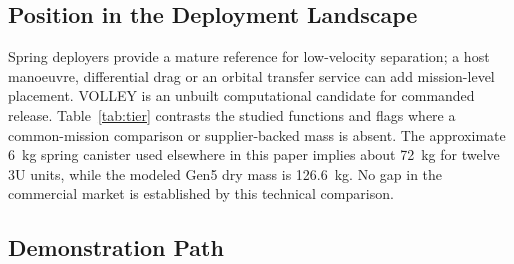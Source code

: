 \documentclass[conference]{IEEEtran}
\begin{document}
\subsection{Position in the Deployment Landscape}
Spring deployers provide a mature reference for low-velocity separation; a host manoeuvre, differential drag or an orbital transfer service can add mission-level placement. VOLLEY is an unbuilt computational candidate for commanded release. Table~\ref{tab:tier} contrasts the studied functions and flags where a common-mission comparison or supplier-backed mass is absent. The approximate 6~kg spring canister used elsewhere in this paper implies about 72~kg for twelve 3U units, while the modeled Gen5 dry mass is 126.6~kg. No gap in the commercial market is established by this technical comparison.

\begin{table}[t]
\caption{Service tiers for small-satellite orbit placement. VOLLEY's system mass is 126.6~kg dry and 174.6~kg loaded with twelve 3U satellites}
\label{tab:tier}
\end{table}

\subsection{Demonstration Path}
\end{document}
